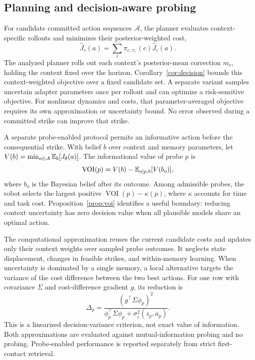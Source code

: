\subsection{Planning and decision-aware probing}\label{sec:planning}
For candidate committed action sequences $\mathcal A$, the planner evaluates context-specific rollouts and minimizes their posterior-weighted cost,
\begin{equation}\label{eq:planning}
 \widehat J_e(a)=\sum_c\pi_{e,\tau_e^-}(c)\widehat J_c(a).
\end{equation}
The analyzed planner rolls out each context's posterior-mean correction $m_c$, holding the context fixed over the horizon. Corollary~\ref{cor:decision} bounds this context-weighted objective over a fixed candidate set. A separate variant samples uncertain adapter parameters once per rollout and can optimize a risk-sensitive objective. For nonlinear dynamics and costs, that parameter-averaged objective requires its own approximation or uncertainty bound. No error observed during a committed strike can improve that strike.

A separate probe-enabled protocol permits an informative action before the consequential strike. With belief $b$ over context and memory parameters, let $V(b)=\min_{a\in\mathcal A}\mathbb{E}_b[J_\theta(a)]$. The informational value of probe $p$ is
\begin{equation}\label{eq:voi}
 \operatorname{VOI}(p)=V(b)-\mathbb{E}_{o\mid p,b}[V(b_o)],
\end{equation}
where $b_o$ is the Bayesian belief after its outcome. Among admissible probes, the robot selects the largest positive $\operatorname{VOI}(p)-\kappa(p)$, where $\kappa$ accounts for time and task cost. Proposition~\ref{prop:voi} identifies a useful boundary: reducing context uncertainty has zero decision value when all plausible models share an optimal action.

The computational approximation reuses the current candidate costs and updates only their context weights over sampled probe outcomes. It neglects state displacement, changes in feasible strikes, and within-memory learning. When uncertainty is dominated by a single memory, a local alternative targets the variance of the cost difference between the two best actions. For one row with covariance $\Sigma$ and cost-difference gradient $g$, its reduction is
\begin{equation}\label{eq:coptimal}
 \Delta_p=\frac{(g^\top\Sigma\phi_p)^2}
 {\phi_p^\top\Sigma\phi_p+\sigma_i^2(z_p,a_p)}.
\end{equation}
This is a linearized decision-variance criterion, not exact value of information. Both approximations are evaluated against mutual-information probing and no probing. Probe-enabled performance is reported separately from strict first-contact retrieval.

